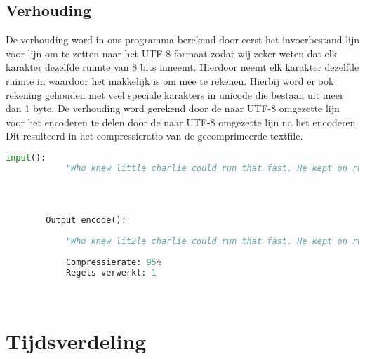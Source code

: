 \documentclass{article}
\begin{document}
    
    \subsection{Verhouding}
        De verhouding word in ons programma berekend door eerst het invoerbestand lijn voor lijn om te zetten naar het UTF-8 formaat zodat wij zeker weten dat elk karakter dezelfde ruimte van 8 bits inneemt. Hierdoor neemt elk karakter dezelfde ruimte in waardoor het makkelijk is om mee te rekenen. Hierbij word er ook rekening gehouden met veel speciale karakters in unicode die bestaan uit meer dan 1 byte. De verhouding word gerekend door de  naar UTF-8 omgezette lijn voor het encoderen te delen door de naar UTF-8 omgezette lijn na het encoderen. Dit resulteerd in het compressieratio van de gecomprimeerde textfile. 
        \newpage
        \begin{lstlisting}[frame=single, language=python]  % Start your code-block
        input():
            "Who knew little charlie could run that fast. He kept on running faster fasteer and fasteeeeeerr !"
            
            
        
        
        Output encode():    
            
            "Who knew lit2le charlie could run that fast. He kept on run2ing faster faste2r and faste6r2 !"
                
            Compressierate: 95%
            Regels verwerkt: 1

            
        \end{lstlisting}

\section{Tijdsverdeling}
\end{document}

